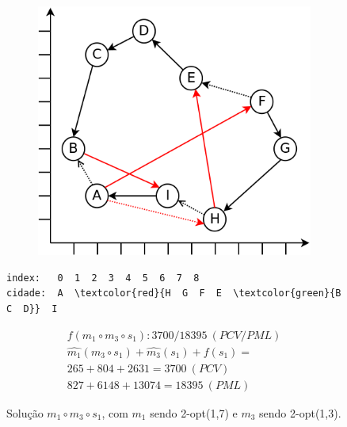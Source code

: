 \begin{figure}[ht]
    \begin{minipage}{.475\textwidth}
        \begin{subfigure}[t]{1\textwidth} %
            \includegraphics[width=1\linewidth]{figuras/pml/exemplo-rodolfo-2opt-1-7-1-3.png}
        \end{subfigure}
    \end{minipage}
    \begin{minipage}{.475\textwidth}
\begin{Verbatim}[commandchars=\\\{\}]
index:   0  1  2  3  4  5  6  7  8
cidade:  A  \textcolor{red}{H  G  F  E  \textcolor{green}{B  C  D}}  I
\end{Verbatim}
\begin{gather*}
f(m_1 \circ m_3 \circ s_1) : 3700/18395 \ (PCV/PML)\\
\widehat{m_1}(m_3 \circ s_1) + \widehat{m_3}(s_1) + f(s_1) =\\
265+804+2631=3700 \ (PCV) \\
827+6148+13074=18395 \ (PML)
\end{gather*}
    \end{minipage}
    \caption{Solução $m_1 \circ m_3 \circ s_1$, com $m_1$ sendo 2-opt(1,7) e $m_3$ sendo 2-opt(1,3).}
    \label{fig:figuraExemplo_m1m3s1}
\end{figure}

